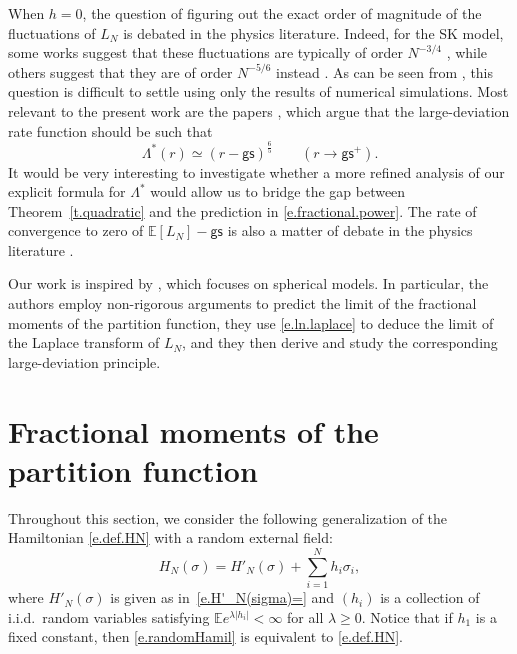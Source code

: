 \documentclass[11pt]{amsart}
\theoremstyle{remark}
\theoremstyle{definition}
\numberwithin{equation}{section}
\numberwithin{proposition}{section}
\numberwithin{figure}{section}
\numberwithin{table}{section}
\newcommand{\E}{\mathbb{E}}
\renewcommand{\geq}{\geqslant}
\newcommand{\1}{\mathbf{1}}
\begin{document}
When $h = 0$, the question of figuring out the exact order of magnitude of the fluctuations of $L_N$ is debated in the physics literature. Indeed, for the SK model, some works suggest that these fluctuations are typically of order $N^{-3/4}$ \cite{boettcher2005extremal, bouchaud2003energy, kim2007ground, palassini2003ground}, while others suggest that they are of order $N^{-5/6}$ instead \cite{aspelmeier2008finite, crisanti1992replica, palassini2008ground, parisi2008large, parisi2009phase, parisi2010universality}. As can be seen from \cite{boettcher2010simulations, palassini2003ground, palassini2008ground}, this question is difficult to settle using only the results of numerical simulations. Most relevant to the present work are the papers \cite{parisi2008large, parisi2009phase, parisi2010universality}, which argue that the large-deviation rate function should be such that 
\begin{equation}  
\label{e.fractional.power}
\Lambda^*(r) \simeq (r - \mathsf{gs})^{\frac 6 5} \qquad (r \to \mathsf{gs}^+).
\end{equation}
It would be very interesting to investigate whether a more refined analysis of our explicit formula for $\Lambda^*$ would allow us to bridge the gap between Theorem~\ref{t.quadratic} and the prediction in \eqref{e.fractional.power}. 
The rate of convergence to zero of $\E[L_N] - \mathsf{gs}$ is also a matter of debate in the physics literature \cite{aspelmeier2008finite, boettcher2005extremal, boettcher2010simulations, franz2026overlap, kim2007ground, palassini2008ground, parisi2019study}. 

Our work is inspired by \cite{lacroix2024replica}, which focuses on spherical models. In particular, the authors employ non-rigorous arguments to predict the limit of the fractional moments of the partition function, they use \eqref{e.ln.laplace} to deduce the limit of the Laplace transform of $L_N$, and they then derive and study the corresponding large-deviation principle.




%
%
%
%
%
%



\section{Fractional moments of the partition function}
\label{s.fractional}

Throughout this section, we consider the following generalization of the Hamiltonian \eqref{e.def.HN} with a random external field:
\begin{equation}\label{e.randomHamil}
    H_N(\sigma) = H'_N(\sigma) + \sum_{i=1}^N h_i \sigma_i,
\end{equation}
where $H'_N(\sigma)$ is given as in~\eqref{e.H'_N(sigma)=} and $(h_i)$ is a collection of i.i.d.\ random variables satisfying $ \E e^{\lambda |h_i|}<\infty$ for all $\lambda\geq0$. Notice that if $h_1$ is a fixed constant, then \eqref{e.randomHamil} is equivalent to \eqref{e.def.HN}.
\end{document}
